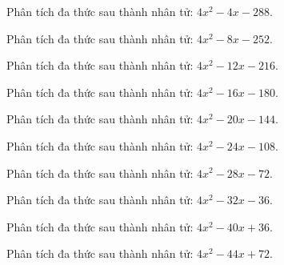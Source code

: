 \begin{bt}
	Phân tích đa thức sau thành nhân tử: $4 x^2 - 4 x - 288$.
\end{bt}
\begin{bt}
	Phân tích đa thức sau thành nhân tử: $4 x^2 - 8 x - 252$.
\end{bt}
\begin{bt}
	Phân tích đa thức sau thành nhân tử: $4 x^2 - 12 x - 216$.
\end{bt}
\begin{bt}
	Phân tích đa thức sau thành nhân tử: $4 x^2 - 16 x - 180$.
\end{bt}
\begin{bt}
	Phân tích đa thức sau thành nhân tử: $4 x^2 - 20 x - 144$.
\end{bt}
\begin{bt}
	Phân tích đa thức sau thành nhân tử: $4 x^2 - 24 x - 108$.
\end{bt}
\begin{bt}
	Phân tích đa thức sau thành nhân tử: $4 x^2 - 28 x - 72$.
\end{bt}
\begin{bt}
	Phân tích đa thức sau thành nhân tử: $4 x^2 - 32 x - 36$.
\end{bt}
\begin{bt}
	Phân tích đa thức sau thành nhân tử: $4 x^2 - 40 x + 36$.
\end{bt}
\begin{bt}
	Phân tích đa thức sau thành nhân tử: $4 x^2 - 44 x + 72$.
\end{bt}
